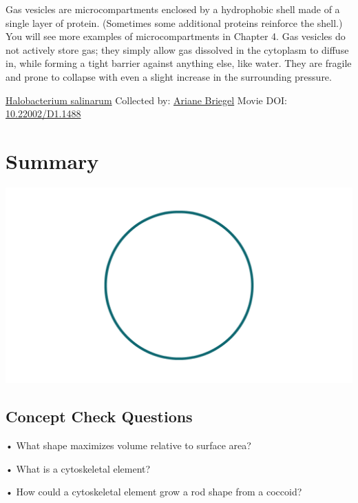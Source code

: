 \documentclass[]{tufte-book}
\begin{document}
Gas vesicles are microcompartments enclosed by a hydrophobic shell made of a single layer of protein. (Sometimes some additional proteins reinforce the shell.) You will see more examples of microcompartments in Chapter 4. Gas vesicles do not actively store gas; they simply allow gas dissolved in the cytoplasm to diffuse in, while forming a tight barrier against anything else, like water. They are fragile and prone to collapse with even a slight increase in the surrounding pressure.



\hypertarget{htmlwidget-e73276d86bc9bdbc2601}{}

\label{fig:3-7a}\protect\hyperlink{tree}{Halobacterium salinarum} Collected by: \protect\hyperlink{ariane_briegel}{Ariane Briegel} Movie DOI: \href{https://doi.org/10.22002/D1.1488}{10.22002/D1.1488}

\hypertarget{summary-2}{%
\section{Summary}\label{summary-2}}

\includegraphics{img/summaries/03_Shape}

\hypertarget{concept-check-questions-2}{%
\subsection*{Concept Check Questions}\label{concept-check-questions-2}}

• What shape maximizes volume relative to surface area?

• What is a cytoskeletal element?

• How could a cytoskeletal element grow a rod shape from a coccoid?
\end{document}
